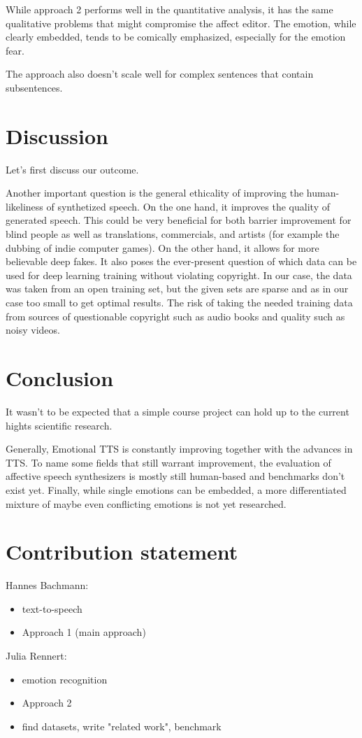 \documentclass[11pt]{article}
\begin{document}

While approach 2 performs well in the quantitative analysis, it has the same qualitative problems that might compromise the affect editor. The emotion, while clearly embedded, tends to be comically emphasized, especially for the emotion fear.

The approach also doesn't scale well for complex sentences that contain subsentences.
\section{Discussion}
\label{discussion}
Let's first discuss our outcome.

Another important question is the general ethicality of improving the human-likeliness of synthetized speech. On the one hand, it improves the quality of generated speech. This could be very beneficial for both barrier improvement for blind people as well as translations, commercials, and artists (for example the dubbing of indie computer games). On the other hand, it allows for more believable deep fakes. It also poses the ever-present question of which data can be used for deep learning training without violating copyright. In our case, the data was taken from an open training set, but the given sets are sparse and as in our case too small to get optimal results\cite{he_improve_2022}. The risk of taking the needed training data from sources of questionable copyright such as audio books and quality such as noisy videos.

\section{Conclusion}
\label{conclusion}
It wasn't to be expected that a simple course project can hold up to the current hights scientific research.

Generally, Emotional TTS is constantly improving together with the advances in TTS. To name some fields that still warrant improvement, the evaluation of affective speech synthesizers is mostly still human-based and benchmarks don't exist yet. Finally, while single emotions can be embedded, a more differentiated mixture of maybe even conflicting emotions is not yet researched.

\section{Contribution statement}
Hannes Bachmann:
\begin{itemize}
\item text-to-speech
\item Approach 1 (main approach)
\end{itemize}
Julia Rennert:
\begin{itemize}
\item emotion recognition
\item Approach 2
\item find datasets, write "related work", benchmark
\end{itemize}
\end{document}
